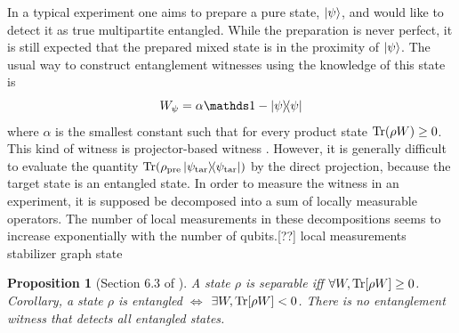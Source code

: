 \documentclass[
reprint,
aps,
pra,
]{revtex4-2}
\theoremstyle{plain}
\newtheorem{proposition}{Proposition}
\theoremstyle{definition}
\newtheorem{remark}{Remark}
\newcommand{\ew}{W}
\newcommand{\target}{\textup{tar}}
\newcommand{\prepare}{\textup{pre}}
\newcommand{\dm}{\rho}
\begin{document}
In a typical experiment one aims to prepare a pure state, $\ket{\psi}$, and would like to detect it as true multipartite entangled. 
While the preparation is never perfect, it is still expected that the prepared mixed state is in the proximity of $\ket{\psi}$. The usual way to construct entanglement witnesses using the knowledge of this state is
\begin{equation}
	\ew_{\psi} = \alpha\identity - \op{\psi} 
	\label{eq:entanglement_witness}
\end{equation}
where $\alpha$ is the smallest constant such that for every product state $\Tr(\dm\ew)\ge 0$.
This kind of witness is projector-based witness \cite{bourennaneWitnessingMultipartiteEntanglement2004}.
However, it is generally difficult to evaluate the quantity $\Tr(\dm_{\prepare} \op{\psi_{\target}})$ by the direct projection, because the target state is an entangled state.
In order to measure the witness in an experiment, it is supposed be decomposed into a sum of locally measurable operators. 
The number of local measurements in these decompositions seems to increase exponentially with the number of qubits.[??]
local measurements \cite{tothDetectingGenuineMultipartite2005}
stabilizer \cite{tothEntanglementDetectionStabilizer2005}
graph state \cite{zhouDetectingMultipartiteEntanglement2019}
\begin{proposition}[Section 6.3 of \cite{heinosaariMathematicalLanguageQuantum2011}]
	A state $\dm$ is separable iff $\forall \ew,\Tr[\dm \ew]\ge 0$. 
	Corollary, a state $\dm$ is entangled $\iff$  $\exists \ew,\Tr[\dm \ew]<0$. 
	There is no entanglement witness that detects all entangled states.
\end{proposition}
\end{document}
